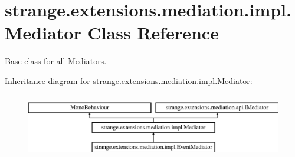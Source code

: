 \hypertarget{classstrange_1_1extensions_1_1mediation_1_1impl_1_1_mediator}{\section{strange.\-extensions.\-mediation.\-impl.\-Mediator Class Reference}
\label{classstrange_1_1extensions_1_1mediation_1_1impl_1_1_mediator}
}


Base class for all Mediators.  


Inheritance diagram for strange.\-extensions.\-mediation.\-impl.\-Mediator\-:\begin{figure}[H]
\begin{center}
\leavevmode
\includegraphics[height=2.857143cm]{classstrange_1_1extensions_1_1mediation_1_1impl_1_1_mediator}
\end{center}
\end{figure}
